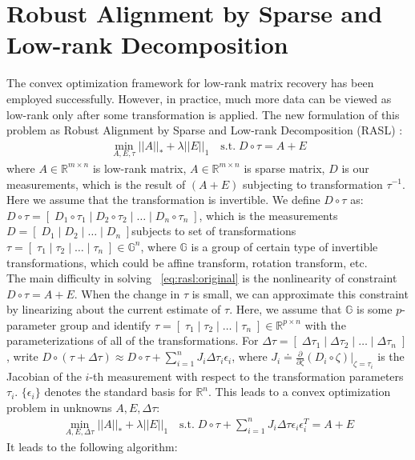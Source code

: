 \documentclass{../common/projectreport}
\begin{document}
\section{Robust Alignment by Sparse and Low-rank Decomposition}
\label{sec: RASL}

The convex optimization framework for low-rank matrix recovery has been employed successfully. However, in practice, much more data can be viewed as low-rank only after some transformation is applied. The new formulation of this problem as Robust Alignment by Sparse and Low-rank Decomposition (RASL) \cite{Peng:2010}:
\begin{align}
\min_{A, E, \tau}  ||A||_{*} + \lambda||E||_{1} \quad  \text{s.t.} \;  D\circ\tau = A+E
\label{eq:rasl:original}
\end{align}
where $A  \in\mathbb{R}^{m\times n}$ is low-rank matrix, $A\in\mathbb{R}^{m\times n}$ is sparse matrix, $D$ is our measurements, which is the result of $(A+E)$ subjecting to transformation $\tau^{-1}$. Here we assume that the transformation is invertible. 
We define $D\circ\tau$ as: $D\circ\tau = [\;D_{1}\circ\tau_{1} \;|\;D_{2}\circ\tau_{2} \;|\; \dots \;|\; D_{n}\circ\tau_{n}\;]$, which is the measurements $D=[\;D_{1} \;|\;D_{2} \;|\; \dots \;|\; D_{n}\;] $subjects to set of transformations $\tau=[\;\tau_{1} \;|\;\tau_{2} \;|\; \dots \;|\; \tau_{n}\;] \in\mathbb{G}^n$, where $\mathbb{G}$ is a group of certain type of invertible transformations, which could be affine transform, rotation transform, etc.  \\

The main difficulty in solving ~\eqref{eq:rasl:original} is the nonlinearity of constraint $D\circ\tau = A+E$. When the change in $\tau$ is small, we can approximate this constraint by linearizing about the current estimate of $\tau$. Here, we assume that $\mathbb{G}$ is some $p$-parameter group and identify $\tau=[\;\tau_{1} \;|\;\tau_{2} \;|\; \dots \;|\; \tau_{n}\;] \in \mathbb{R}^{p\times n}$ with the parameterizations of all of the transformations. For $\Delta\tau = [\;\Delta\tau_{1} \;|\; \Delta\tau_{2} \;|\; \dots \;|\; \Delta\tau_{n}\;]$, write $D\circ(\tau+\Delta\tau) \approx D\circ\tau + \sum_{i=1}^n J_{i}\Delta\tau_{i}\epsilon_{i}$, where $J_{i} \doteq \frac{\partial}{\partial\zeta}(D_{i}\circ\zeta)|_{\zeta = \tau_{i}}$ is the Jacobian of the $i$-th measurement with respect to the transformation parameters $\tau_{i}$. $\{\epsilon_{i}\}$ denotes the standard basis for $\mathbb{R}^n$. This leads to a convex optimization problem in unknowns $A, E, \Delta\tau$:
\begin{align}
\min_{A, E, \Delta\tau}  ||A||_{*} + \lambda||E||_{1}  \quad \text{s.t.} \;  D\circ\tau + \sum_{i=1}^n J_{i}\Delta\tau\epsilon_{i}\epsilon_{i}^{T}= A+E
\label{eq:rasl:linearized}
\end{align}
It leads to the following algorithm:
\end{document}

